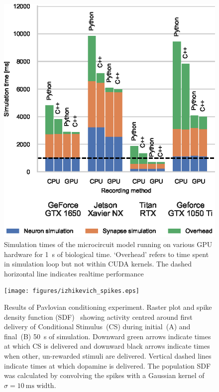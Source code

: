 \documentclass[utf8]{frontiersSCNS} %
\begin{document}
%
\begin{figure}[t!]
    \begin{center}
        \includegraphics{figures/microcircuit_overheads.eps}
    \end{center}
    \caption{Simulation times of the microcircuit model running on various GPU hardware for \SI{1}{\second} of biological time.
    `Overhead' refers to time spent in simulation loop but not within CUDA kernels.
    The dashed horizontal line indicates realtime performance}
    \label{fig:microcircuit_overheads}
\end{figure}
%
\begin{figure}[t!]
    \begin{center}
        \texttt{[image: figures/izhikevich\_spikes.eps]}
    \end{center}
    \caption{Results of Pavlovian conditioning experiment.
             Raster plot and spike density function (SDF)~\citep{Szucs1998a} showing activity centred around first delivery of Conditional Stimulus~(CS) during initial~(A) and final~(B) \SI{50}{\second} of simulation.
             Downward green arrows indicate times at which CS is delivered and downward black arrows indicate times when other, un-rewarded stimuli are delivered. 
             Vertical dashed lines indicate times at which dopamine is delivered.
             The population SDF was calculated by convolving the spikes with a Gaussian kernel of $\sigma=\SI{10}{\milli\second}$ width.}
    \label{fig:izhikevich_spikes}
\end{figure}
%
\end{document}
